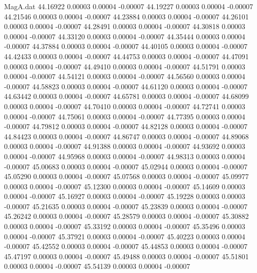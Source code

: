 \begin{filecontents}{MagA.dat}
  44.16922    0.00003    0.00004   -0.00007
  44.19227    0.00003    0.00004   -0.00007
  44.21546    0.00003    0.00004   -0.00007
  44.23884    0.00003    0.00004   -0.00007
  44.26101    0.00003    0.00004   -0.00007
  44.28491    0.00003    0.00004   -0.00007
  44.30818    0.00003    0.00004   -0.00007
  44.33120    0.00003    0.00004   -0.00007
  44.35444    0.00003    0.00004   -0.00007
  44.37884    0.00003    0.00004   -0.00007
  44.40105    0.00003    0.00004   -0.00007
  44.42433    0.00003    0.00004   -0.00007
  44.44753    0.00003    0.00004   -0.00007
  44.47091    0.00003    0.00004   -0.00007
  44.49410    0.00003    0.00004   -0.00007
  44.51791    0.00003    0.00004   -0.00007
  44.54121    0.00003    0.00004   -0.00007
  44.56560    0.00003    0.00004   -0.00007
  44.58823    0.00003    0.00004   -0.00007
  44.61120    0.00003    0.00004   -0.00007
  44.63442    0.00003    0.00004   -0.00007
  44.65781    0.00003    0.00004   -0.00007
  44.68099    0.00003    0.00004   -0.00007
  44.70410    0.00003    0.00004   -0.00007
  44.72741    0.00003    0.00004   -0.00007
  44.75061    0.00003    0.00004   -0.00007
  44.77395    0.00003    0.00004   -0.00007
  44.79812    0.00003    0.00004   -0.00007
  44.82128    0.00003    0.00004   -0.00007
  44.84423    0.00003    0.00004   -0.00007
  44.86747    0.00003    0.00004   -0.00007
  44.89068    0.00003    0.00004   -0.00007
  44.91388    0.00003    0.00004   -0.00007
  44.93692    0.00003    0.00004   -0.00007
  44.95968    0.00003    0.00004   -0.00007
  44.98313    0.00003    0.00004   -0.00007
  45.00683    0.00003    0.00004   -0.00007
  45.02944    0.00003    0.00004   -0.00007
  45.05290    0.00003    0.00004   -0.00007
  45.07568    0.00003    0.00004   -0.00007
  45.09977    0.00003    0.00004   -0.00007
  45.12300    0.00003    0.00004   -0.00007
  45.14609    0.00003    0.00004   -0.00007
  45.16927    0.00003    0.00004   -0.00007
  45.19228    0.00003    0.00003   -0.00007
  45.21635    0.00003    0.00004   -0.00007
  45.23839    0.00003    0.00004   -0.00007
  45.26242    0.00003    0.00004   -0.00007
  45.28579    0.00003    0.00004   -0.00007
  45.30882    0.00003    0.00004   -0.00007
  45.33192    0.00003    0.00004   -0.00007
  45.35496    0.00003    0.00004   -0.00007
  45.37921    0.00003    0.00004   -0.00007
  45.40223    0.00003    0.00004   -0.00007
  45.42552    0.00003    0.00004   -0.00007
  45.44853    0.00003    0.00004   -0.00007
  45.47197    0.00003    0.00004   -0.00007
  45.49488    0.00003    0.00004   -0.00007
  45.51801    0.00003    0.00004   -0.00007
  45.54139    0.00003    0.00004   -0.00007

\end{filecontents}
